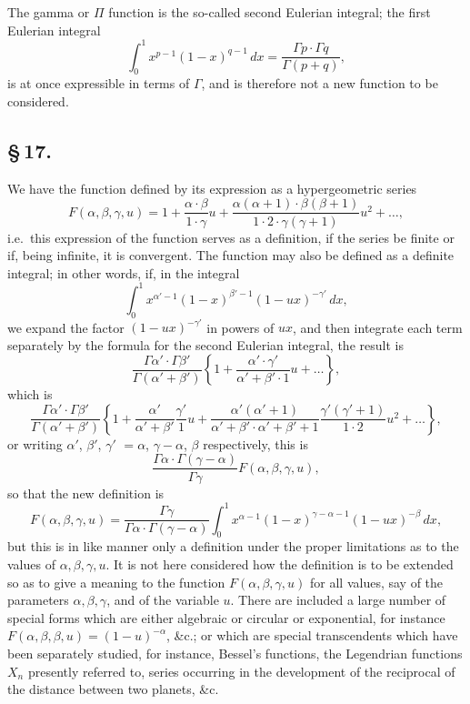 \documentclass[11pt,a4paper]{article}
\begin{document}
The gamma or $\Pi$ function is the so-called second Eulerian integral; the first Eulerian integral
\[
\int_{0}^{1}x^{p-1}(1 - x)^{q-1}\,dx = \frac{\Gamma p \cdot \Gamma q}{\Gamma(p + q)},
\]
is at once expressible in terms of $\Gamma$, and is therefore not a new function to be considered.

\subsection*{\S\,17.}

We have the function defined by its expression as a hypergeometric series
\[
F(\alpha, \beta, \gamma, u) = 1 + \frac{\alpha \cdot \beta}{1 \cdot \gamma}u + \frac{\alpha(\alpha + 1) \cdot \beta(\beta + 1)}{1 \cdot 2 \cdot \gamma(\gamma + 1)}u^{2} + \ldots,
\]
i.e.\ this expression of the function serves as a definition, if the series be finite or if, being infinite, it is convergent. The function may also be defined as a definite integral; in other words, if, in the integral
\[
\int_{0}^{1}x^{\alpha' - 1}(1 - x)^{\beta' - 1}(1 - ux)^{-\gamma'}\,dx,
\]
we expand the factor $(1 - ux)^{-\gamma'}$ in powers of $ux$, and then integrate each term separately by the formula for the second Eulerian integral, the result is
\[
\frac{\Gamma\alpha' \cdot \Gamma\beta'}{\Gamma(\alpha' + \beta')}\left\{1 + \frac{\alpha' \cdot \gamma'}{\alpha' + \beta' \cdot 1}u + \ldots\right\},
\]
which is
\[
\frac{\Gamma\alpha' \cdot \Gamma\beta'}{\Gamma(\alpha' + \beta')}\left\{1 + \frac{\alpha'}{\alpha' + \beta'}\frac{\gamma'}{1}u + \frac{\alpha'(\alpha' + 1)}{\alpha' + \beta' \cdot \alpha' + \beta' + 1}\frac{\gamma'(\gamma' + 1)}{1 \cdot 2}u^{2} + \ldots\right\},
\]
or writing $\alpha'$, $\beta'$, $\gamma'$ $= \alpha$, $\gamma - \alpha$, $\beta$ respectively, this is
\[
\frac{\Gamma\alpha \cdot \Gamma(\gamma - \alpha)}{\Gamma\gamma}F(\alpha, \beta, \gamma, u),
\]
so that the new definition is
\[
F(\alpha, \beta, \gamma, u) = \frac{\Gamma\gamma}{\Gamma\alpha \cdot \Gamma(\gamma - \alpha)}\int_{0}^{1}x^{\alpha - 1}(1 - x)^{\gamma - \alpha - 1}(1 - ux)^{-\beta}\,dx,
\]
but this is in like manner only a definition under the proper limitations as to the values of $\alpha, \beta, \gamma, u$. It is not here considered how the definition is to be extended so as to give a meaning to the function $F(\alpha, \beta, \gamma, u)$ for all values, say of the parameters $\alpha, \beta, \gamma$, and of the variable $u$. There are included a large number of special forms which are either algebraic or circular or exponential, for instance $F(\alpha, \beta, \beta, u) = (1 - u)^{-\alpha}$, \&c.; or which are special transcendents which have been separately studied, for instance, Bessel's functions, the Legendrian functions $X_{n}$ presently referred to, series occurring in the development of the reciprocal of the distance between two planets, \&c.
\end{document}
